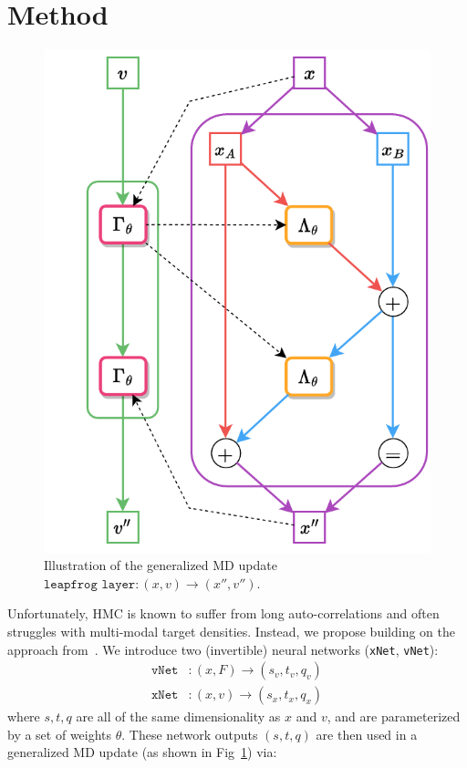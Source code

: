 \documentclass[a4paper,11pt]{article}
\begin{document}
\section{\label{sec:method}Method}
%
\begin{figure}
  \begin{center}
    \includegraphics[width=\linewidth]{assets/leapfrog-layer-alt-2.pdf}
  \end{center}
    \caption{\label{fig:lf-layer}Illustration of the generalized MD update
    $\texttt{leapfrog layer}: (x, v) \rightarrow (x'', v'')$.}
\end{figure}
%
Unfortunately, HMC is known to suffer from long auto-correlations and often
struggles with multi-modal target densities.
%
Instead, we propose building on the approach from~\cite{L2HMC,FTHMC,etc}. We
introduce two (invertible) neural networks (\texttt{xNet}, \texttt{vNet}):
%
\begin{align}
\texttt{vNet}&: (x, F) \rightarrow (s_{v}, t_{v}, q_{v}) \\
\texttt{xNet}&: (x, v) \rightarrow (s_{x}, t_{x}, q_{x})
\end{align}
%
where $s, t, q$ are all of the same dimensionality as $x$ and $v$, and are
parameterized by a set of weights $\theta$.
%
These network outputs $(s, t, q)$ are then used in a generalized MD update (as
shown in Fig~\ref{fig:lf-layer}) via:
%
\end{document}
